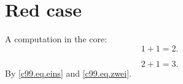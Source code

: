 \chapter{Red case}\label{c99}

A computation in the core:
\begin{equation}\label{c99.eq.eins}
  1 + 1 = 2.
\end{equation}

\begin{equation}\label{c99.eq.zwei}
  2 + 1 = 3.
\end{equation}
By \eqref{c99.eq.eins} and \eqref{c99.eq.zwei}.

